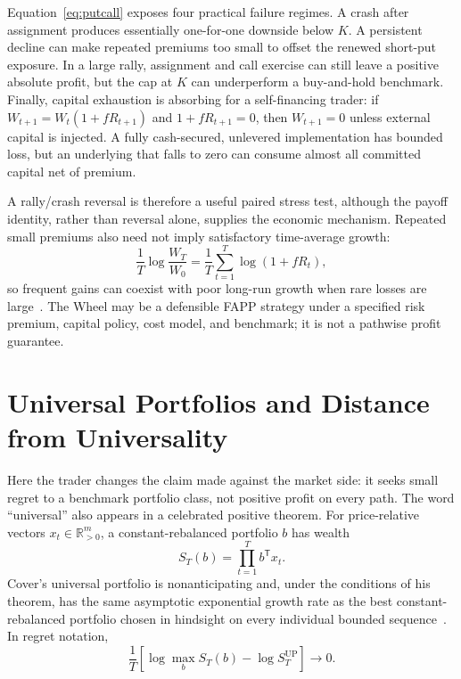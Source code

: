 \documentclass[aps,pra,reprint,superscriptaddress,amsmath,amssymb,floatfix]{revtex4-2}
\theoremstyle{plain}
\theoremstyle{definition}
\theoremstyle{remark}
\begin{document}
Equation~\eqref{eq:putcall} exposes four practical failure regimes. A crash
after assignment produces essentially one-for-one downside below \(K\). A
persistent decline can make repeated premiums too small to offset the renewed
short-put exposure. In a large rally, assignment and call exercise can still
leave a positive absolute profit, but the cap at \(K\) can underperform a
buy-and-hold benchmark. Finally, capital exhaustion is absorbing for a
self-financing trader: if \(W_{t+1}=W_t(1+fR_{t+1})\) and
\(1+fR_{t+1}=0\), then \(W_{t+1}=0\) unless external capital is injected. A
fully cash-secured, unlevered implementation has bounded loss, but an
underlying that falls to zero can consume almost all committed capital net of
premium.

A rally/crash reversal is therefore a useful paired stress test, although the
payoff identity, rather than reversal alone, supplies the economic mechanism.
Repeated small premiums also need not imply satisfactory time-average growth:
\[
  \frac1T\log\frac{W_T}{W_0}
  =\frac1T\sum_{t=1}^T\log(1+fR_t),
\]
so frequent gains can coexist with poor long-run growth when rare losses are
large~\cite{Peters2019}. The Wheel may be a defensible FAPP strategy under a
specified risk premium, capital policy, cost model, and benchmark; it is not a
pathwise profit guarantee.

\section{Universal Portfolios and Distance from Universality}
\label{sec:cover}

Here the trader changes the claim made against the market side: it seeks small
regret to a benchmark portfolio class, not positive profit on every path. The
word ``universal'' also appears in a celebrated positive theorem.
For price-relative vectors \(x_t\in\mathbb{R}_{>0}^m\), a constant-rebalanced
portfolio \(b\) has wealth
\[
  S_T(b)=\prod_{t=1}^T b^\mathsf{T}x_t.
\]
Cover's universal portfolio is nonanticipating and, under the conditions of
his theorem, has the same asymptotic exponential growth rate as the best
constant-rebalanced portfolio chosen in hindsight on every individual bounded
sequence~\cite{Cover1991}. In regret notation,
\begin{equation}
  \frac1T\left[
  \log\max_{b}S_T(b)-\log S_T^{\mathrm{UP}}
  \right]\longrightarrow0.
  \label{eq:cover}
\end{equation}
\end{document}
